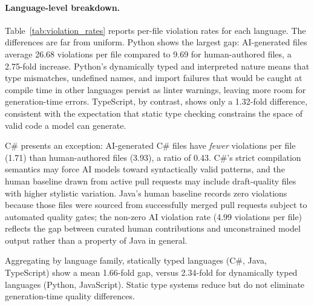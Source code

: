 \paragraph{Language-level breakdown.}
Table~\ref{tab:violation_rates} reports per-file violation rates for each language. The differences are far from uniform. Python shows the largest gap: AI-generated files average 26.68 violations per file compared to 9.69 for human-authored files, a 2.75-fold increase. Python's dynamically typed and interpreted nature means that type mismatches, undefined names, and import failures that would be caught at compile time in other languages persist as linter warnings, leaving more room for generation-time errors. TypeScript, by contrast, shows only a 1.32-fold difference, consistent with the expectation that static type checking constrains the space of valid code a model can generate.

C\# presents an exception: AI-generated C\# files have \emph{fewer} violations per file (1.71) than human-authored files (3.93), a ratio of 0.43. C\#'s strict compilation semantics may force AI models toward syntactically valid patterns, and the human baseline drawn from active pull requests may include draft-quality files with higher stylistic variation. Java's human baseline records zero violations because those files were sourced from successfully merged pull requests subject to automated quality gates; the non-zero AI violation rate (4.99 violations per file) reflects the gap between curated human contributions and unconstrained model output rather than a property of Java in general.

Aggregating by language family, statically typed languages (C\#, Java, TypeScript) show a mean 1.66-fold gap, versus 2.34-fold for dynamically typed languages (Python, JavaScript). Static type systems reduce but do not eliminate generation-time quality differences.

\begin{table}[H]
\centering
\caption{Linter violation rates by language (V/F = violations per file).}
\label{tab:violation_rates}
\footnotesize
{}
\end{table}

